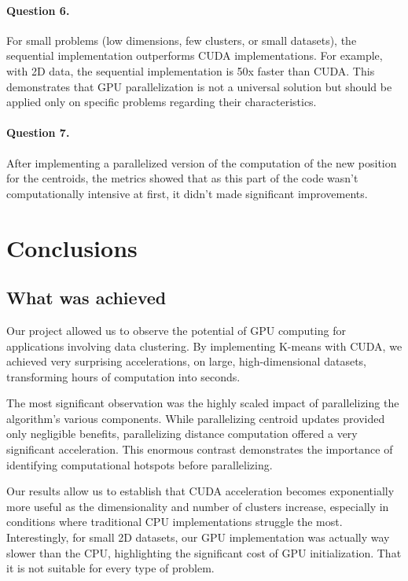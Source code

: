 \documentclass[sigconf]{acmart}
\begin{document}
\paragraph{Question 6.}
For small problems (low dimensions, few clusters, or small datasets), the sequential implementation outperforms CUDA implementations. For example, with 2D data, the sequential implementation is 50x faster than CUDA. This demonstrates that GPU parallelization is not a universal solution but should be applied only on specific problems regarding their characteristics.

\paragraph{Question 7.}
After implementing a parallelized version of the computation of the new position for the centroids, the metrics showed that as this part of the code wasn't computationally intensive at first, it didn't made significant improvements.

\section{Conclusions} 

\subsection{What was achieved}
Our project allowed us to observe the potential of GPU computing for applications involving data clustering. By implementing K-means with CUDA, we achieved very surprising accelerations, on large, high-dimensional datasets, transforming hours of computation into seconds.

The most significant observation was the highly scaled impact of parallelizing the algorithm's various components. While parallelizing centroid updates provided only negligible benefits, parallelizing distance computation offered a very significant acceleration. This enormous contrast demonstrates the importance of identifying computational hotspots before parallelizing.

Our results allow us to establish that CUDA acceleration becomes exponentially more useful as the dimensionality and number of clusters increase, especially in conditions where traditional CPU implementations struggle the most. Interestingly, for small 2D datasets, our GPU implementation was actually way slower than the CPU, highlighting the significant cost of GPU initialization. That it is not suitable for every type of problem.
\end{document}
